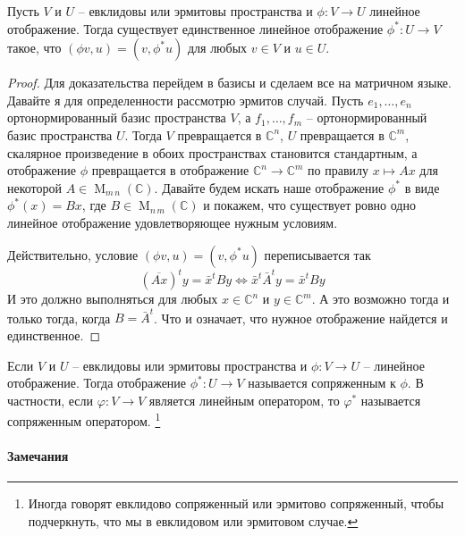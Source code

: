 \begin{claim}
Пусть $V$ и $U$ -- евклидовы или эрмитовы пространства и $\phi\colon V\to U$ линейное отображение.
Тогда существует единственное линейное отображение $\phi^*\colon U\to V$ такое, что $(\phi v, u) = (v, \phi^* u)$ для любых $v\in V$ и $u\in U$.
\end{claim}
\begin{proof}
Для доказательства перейдем в базисы и сделаем все на матричном языке.
Давайте я для определенности рассмотрю эрмитов случай.
Пусть $e_1,\ldots,e_n$ ортонормированный базис пространства $V$, а $f_1,\ldots,f_m$ -- ортонормированный базис пространства $U$.
Тогда $V$ превращается в $\mathbb C^n$, $U$ превращается в $\mathbb C^m$, скалярное произведение в обоих пространствах становится стандартным, а отображение $\phi$ превращается в отображение $\mathbb C^n \to \mathbb C^m$ по правилу $x \mapsto Ax$ для некоторой $A\in\operatorname{M}_{m\,n}(\mathbb C)$.
Давайте будем искать наше отображение $\phi^*$  в виде $\phi^*(x) = Bx$, где $B\in \operatorname{M}_{n\,m}(\mathbb C)$ и покажем, что существует ровно одно линейное отображение удовлетворяющее нужным условиям.

Действительно, условие $(\phi v, u) = (v, \phi^* u)$ переписывается так
\[
(\overline{Ax})^t y = \bar x^t By\iff \bar x^t \bar A^t y = \bar x^t B y
\]
И это должно выполняться для любых $x\in \mathbb C^n$ и $y\in \mathbb C^m$.
А это возможно тогда и только тогда, когда $B = \bar A^t$.
Что и означает, что нужное отображение найдется и единственное.
\end{proof}

\begin{definition}
Если $V$ и $U$ -- евклидовы или эрмитовы пространства и $\phi\colon V\to U$ -- линейное отображение.
Тогда отображение $\phi^*\colon U\to V$ называется сопряженным к $\phi$.
В частности, если $\varphi\colon V\to V$ является линейным оператором, то $\varphi^*$ называется сопряженным оператором.%
\footnote{Иногда говорят евклидово сопряженный или эрмитово сопряженный, чтобы подчеркнуть, что мы в евклидовом или эрмитовом случае.}
\end{definition}

\paragraph{Замечания}

